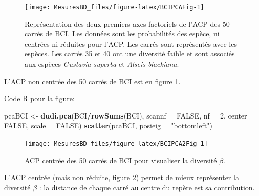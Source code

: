\documentclass[
  11pt,
  french,
  a4paper,
  extrafontsizes,onecolumn,openright
  ]{memoir}
\newenvironment{Shaded}{\begin{snugshade}}{\end{snugshade}}
\newcommand{\DataTypeTok}[1]{\textcolor[rgb]{0.13,0.29,0.53}{#1}}
\newcommand{\DecValTok}[1]{\textcolor[rgb]{0.00,0.00,0.81}{#1}}
\newcommand{\KeywordTok}[1]{\textcolor[rgb]{0.13,0.29,0.53}{\textbf{#1}}}
\newcommand{\NormalTok}[1]{#1}
\newcommand{\OperatorTok}[1]{\textcolor[rgb]{0.81,0.36,0.00}{\textbf{#1}}}
\newcommand{\OtherTok}[1]{\textcolor[rgb]{0.56,0.35,0.01}{#1}}
\newcommand{\StringTok}[1]{\textcolor[rgb]{0.31,0.60,0.02}{#1}}
\begin{document}
\scriptsize

\begin{figure}

{\centering \texttt{[image: MesuresBD\_files/figure-latex/BCIPCAFig-1]} 

}

\caption{Représentation des deux premiers axes factoriels de l'ACP des 50 carrés de BCI. Les données sont les probabilités des espèce, ni centrées ni réduites pour l'ACP. Les carrés sont représentés avec les espèces. Les carrés 35 et 40 ont une diversité faible et sont associés aux espèces \emph{Gustavia superba} et \emph{Alseis blackiana}.}\label{fig:BCIPCAFig}
\end{figure}

\normalsize

L'ACP non centrée des 50 carrés de BCI est en figure \ref{fig:BCIPCAFig}.

Code R pour la figure:

\scriptsize

\begin{Shaded}
\begin{Highlighting}[]
\NormalTok{pcaBCI <-}\StringTok{ }\KeywordTok{dudi.pca}\NormalTok{(BCI}\OperatorTok{/}\KeywordTok{rowSums}\NormalTok{(BCI), }\DataTypeTok{scannf =} \OtherTok{FALSE}\NormalTok{, }\DataTypeTok{nf =} \DecValTok{2}\NormalTok{, }
    \DataTypeTok{center =} \OtherTok{FALSE}\NormalTok{, }\DataTypeTok{scale =} \OtherTok{FALSE}\NormalTok{)}
\KeywordTok{scatter}\NormalTok{(pcaBCI, }\DataTypeTok{posieig =} \StringTok{"bottomleft"}\NormalTok{)}
\end{Highlighting}
\end{Shaded}

\normalsize



\scriptsize

\begin{figure}

{\centering \texttt{[image: MesuresBD\_files/figure-latex/BCIPCA2Fig-1]} 

}

\caption{ACP centrée des 50 carrés de BCI pour visualiser la diversité \(\beta\).}\label{fig:BCIPCA2Fig}
\end{figure}

\normalsize

L'ACP centrée (mais non réduite, figure \ref{fig:BCIPCA2Fig}) permet de mieux représenter la diversité \(\beta\) : la distance de chaque carré au centre du repère est sa contribution.
\end{document}
